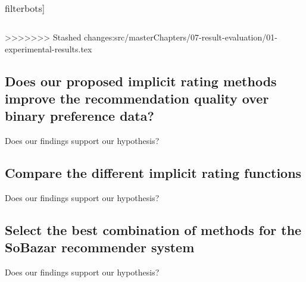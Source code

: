 \begin{table}
{\begin{tabular}{*{19}l}
				

\bottomrule\end{tabular}}\caption{filterbots]}\end{table}

>>>>>>> Stashed changes:src/masterChapters/07-result-evaluation/01-experimental-results.tex

\subsection{Does our proposed implicit rating methods improve the recommendation quality over binary preference data?}

Does our findings support our hypothesis?



\subsection{Compare the different implicit rating functions}

Does our findings support our hypothesis?

\subsection{Select the best combination of methods for the SoBazar recommender system}

Does our findings support our hypothesis?

